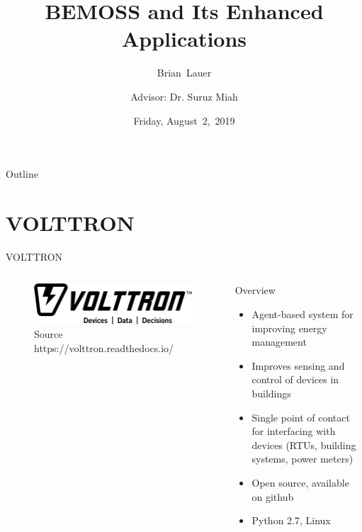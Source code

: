 \documentclass{beamer}
\title[Progress]{BEMOSS and Its Enhanced Applications}
\author[B.~Lauer]{Brian~Lauer \\\and
Advisor: Dr. Suruz Miah}
\institute[Bradley University] %
{
  Department of Electrical and Computer Engineering\\
  Bradley University\\
  1501 W. Bradley Avenue\\
  Peoria, IL, 61625, USA
}
\date[August~2,~2019]{Friday, August~2,~2019}
\begin{document}
\begin{frame}
  \titlepage
\end{frame}

\begin{frame}{Outline}
  \tableofcontents
\end{frame}

\section{VOLTTRON}

\begin{frame}{VOLTTRON}
	\begin{columns}
		\begin{column}{0.5\textwidth}
		\begin{figure}
			\centering
			\includegraphics[scale=0.15]{figs/volttronlogo.png}
			\caption{Source https://volttron.readthedocs.io/}
		\end{figure}
		\end{column}
		\begin{column}{0.5\textwidth}
			\begin{block}{Overview}
			\begin{itemize}
			\item Agent-based system for improving energy management
			\item Improves sensing and control of devices in buildings
			\item Single point of contact for interfacing with devices (RTUs, building systems, power meters)
			\item Open source, available on github
			\item Python 2.7, Linux
			\end{itemize}
			\end{block}
		\end{column}
	\end{columns}
\end{frame}
\end{document}
